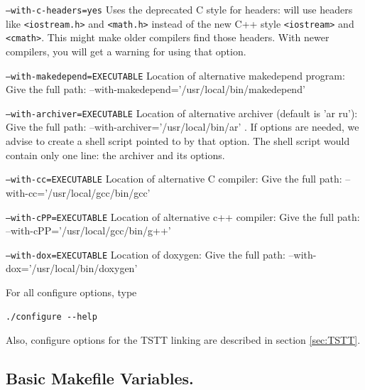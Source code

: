 \documentclass[letter]{report}
\begin{document}
\begin{description}
\item \texttt{--with-c-headers=yes} Uses the deprecated C style for headers:
  will use headers like \texttt{<iostream.h>} and \texttt{<math.h>}
  instead of the new C++ style \texttt{<iostream>} and \texttt{<cmath>}. This might make older
  compilers find those headers. With newer compilers, you will get a warning for using that option.
\item \texttt{--with-makedepend=EXECUTABLE} Location of alternative makedepend program:
Give the full path:  --with-makedepend='/usr/local/bin/makedepend'
\item \texttt{--with-archiver=EXECUTABLE} Location of alternative archiver (default is 'ar ru'):
Give the full path: --with-archiver='/usr/local/bin/ar' . If options are needed, we advise to
create a shell script pointed to by that option. The shell script would contain only one line: the
archiver and its options. 
\item \texttt{--with-cc=EXECUTABLE} Location of alternative C compiler:
Give the full path: --with-cc='/usr/local/gcc/bin/gcc'
\item \texttt{--with-cPP=EXECUTABLE} Location of alternative c++ compiler:
Give the full path:  --with-cPP='/usr/local/gcc/bin/g++'
\item \texttt{--with-dox=EXECUTABLE} Location of doxygen:
Give the full path: --with-dox='/usr/local/bin/doxygen'
\end{description}

For all configure options, type
\begin{verbatim}
./configure --help
\end{verbatim}
Also, configure options for the TSTT linking are described in section \ref{sec:TSTT}.



\subsection{Basic Makefile Variables.}  \label{mes_vars_and_defs}
\end{document}
